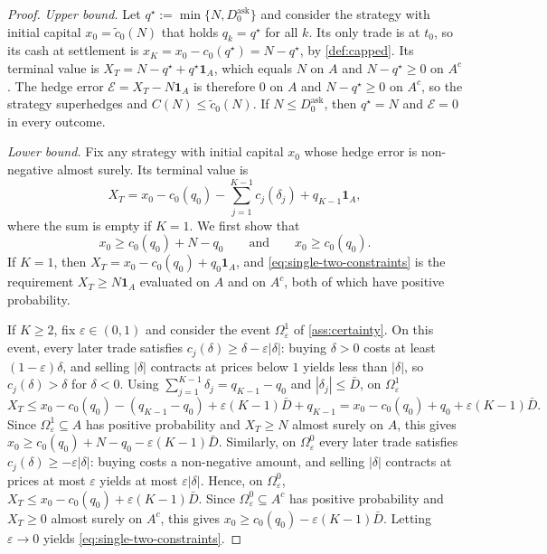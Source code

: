 \documentclass[11pt,a4paper]{article}
\theoremstyle{plain}
\theoremstyle{definition}
\theoremstyle{remark}
\newcommand{\1}{\mathbf{1}}
\begin{document}
\begin{proof}
\emph{Upper bound.} Let $q^\star := \min\{N,D^{\mathrm{ask}}_0\}$ and consider the strategy with initial capital $x_0 = \tilde c_0(N)$ that holds $q_k = q^\star$ for all $k$. Its only trade is at $t_0$, so its cash at settlement is $x_K = x_0 - c_0(q^\star) = N - q^\star$, by \cref{def:capped}. Its terminal value is $X_T = N - q^\star + q^\star\1_A$, which equals $N$ on $A$ and $N-q^\star\geq 0$ on $A^c$. The hedge error $\mathcal{E} = X_T - N\1_A$ is therefore $0$ on $A$ and $N - q^\star\geq 0$ on $A^c$, so the strategy superhedges and $C(N)\leq\tilde c_0(N)$. If $N\leq D^{\mathrm{ask}}_0$, then $q^\star = N$ and $\mathcal{E}=0$ in every outcome.

\emph{Lower bound.} Fix any strategy with initial capital $x_0$ whose hedge error is non-negative almost surely. Its terminal value is
\[
X_T = x_0 - c_0(q_0) - \sum_{j=1}^{K-1} c_j(\delta_j) + q_{K-1}\1_A,
\]
where the sum is empty if $K=1$. We first show that
\begin{equation}
\label{eq:single-two-constraints}
x_0 \geq c_0(q_0) + N - q_0 \qquad\text{and}\qquad x_0\geq c_0(q_0).
\end{equation}
If $K=1$, then $X_T = x_0 - c_0(q_0) + q_0\1_A$, and \eqref{eq:single-two-constraints} is the requirement $X_T\geq N\1_A$ evaluated on $A$ and on $A^c$, both of which have positive probability.

If $K\geq 2$, fix $\varepsilon\in(0,1)$ and consider the event $\Omega^1_\varepsilon$ of \cref{ass:certainty}. On this event, every later trade satisfies $c_j(\delta)\geq\delta - \varepsilon|\delta|$: buying $\delta>0$ costs at least $(1-\varepsilon)\delta$, and selling $|\delta|$ contracts at prices below $1$ yields less than $|\delta|$, so $c_j(\delta)>\delta$ for $\delta<0$. Using $\sum_{j=1}^{K-1}\delta_j = q_{K-1}-q_0$ and $|\delta_j|\leq\bar D$, on $\Omega^1_\varepsilon$
\[
X_T \leq x_0 - c_0(q_0) - (q_{K-1} - q_0) + \varepsilon(K-1)\bar D + q_{K-1} = x_0 - c_0(q_0) + q_0 + \varepsilon(K-1)\bar D.
\]
Since $\Omega^1_\varepsilon\subseteq A$ has positive probability and $X_T\geq N$ almost surely on $A$, this gives $x_0\geq c_0(q_0) + N - q_0 - \varepsilon(K-1)\bar D$. Similarly, on $\Omega^0_\varepsilon$ every later trade satisfies $c_j(\delta)\geq -\varepsilon|\delta|$: buying costs a non-negative amount, and selling $|\delta|$ contracts at prices at most $\varepsilon$ yields at most $\varepsilon|\delta|$. Hence, on $\Omega^0_\varepsilon$, $X_T\leq x_0 - c_0(q_0) + \varepsilon(K-1)\bar D$. Since $\Omega^0_\varepsilon\subseteq A^c$ has positive probability and $X_T\geq 0$ almost surely on $A^c$, this gives $x_0\geq c_0(q_0) - \varepsilon(K-1)\bar D$. Letting $\varepsilon\to 0$ yields \eqref{eq:single-two-constraints}.


\end{proof}
\end{document}
